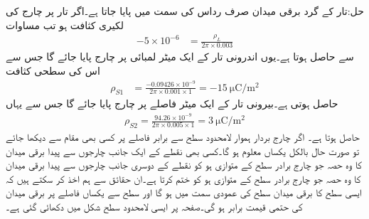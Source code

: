 حل:تار کے گرد برقی میدان صرف رداس کی سمت میں پایا جاتا ہے۔اگر تار پر چارج کی لکیری کثافت  ہو تب مساوات
\begin{align*}
-5 \times 10^{-6}&=\frac{\rho_L}{2 \pi  \times 0.003}
\end{align*}
سے  حاصل ہوتا ہے۔یوں اندرونی تار کے ایک میٹر لمبائی پر  چارج پایا جائے گا جس سے اس کی سطحی کثافت
\begin{align*}
\rho_{S1}&=\frac{-0.09426 \times 10^{-9}}{2\pi \times 0.001 \times 1}=\SI{-15}{\micro \coulomb \per \meter \squared}
\end{align*}
حاصل ہوتی ہے۔بیرونی تار کے ایک میٹر فاصلے پر  چارج پایا جائے گا جس سے یہاں
\begin{align*}
\rho_{S2}=\frac{94.26 \times 10^{-9}}{2\pi \times 0.005 \times 1}=\SI{3}{\micro \coulomb \per \meter \squared}
\end{align*}
حاصل ہوتا ہے۔
اگر چارج بردار ہموار لامحدود سطح  سے برابر فاصلے پر کسی بھی  مقام سے دیکھا جائے تو صورت حال بالکل یکساں معلوم ہو گا۔کسی بھی نقطے کے ایک جانب چارجوں سے پیدا برقی میدان کا وہ حصہ جو چارج برادر سطح  کے متوازی ہو کو نقطے کے دوسری جانب چارجوں سے پیدا برقی میدان کا وہ حصہ جو چارج برادر سطح  کے متوازی ہو کو ختم کرتا ہے۔ان حقائق سے ہم اخذ کر سکتے ہیں کہ ایسی سطح کا برقی میدان سطح کی عمودی سمت میں ہو گا اور سطح سے یکساں فاصلے پر برقی میدان کی حتمی قیمت برابر ہو گی۔صفحہ  پر ایسی لامحدود سطح شکل  میں دکھائی گئی ہے۔


